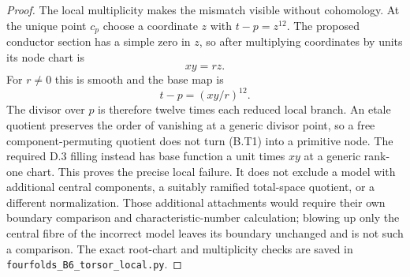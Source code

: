 \begin{proof}
The local multiplicity makes the mismatch visible without
cohomology.  At the unique point $c_p$ choose a coordinate $z$
with $t-p=z^{12}$.  The proposed conductor section has a simple
zero in $z$, so after multiplying coordinates by units its node
chart is
\[
 xy=rz.
\]
For $r\ne0$ this is smooth and the base map is
\[
 t-p=(xy/r)^{12}.
 \tag{B.T1}
\]
The divisor over $p$ is therefore twelve times each reduced local
branch.  An etale quotient preserves the order of vanishing at
a generic divisor point, so a free component-permuting quotient
does not turn (B.T1) into a primitive node.
The required D.3 filling instead has base function a unit times
$xy$ at a generic rank-one chart.  This proves the precise local
failure.  It does not exclude a model with additional central
components, a suitably ramified total-space quotient, or a
different normalization.  Those additional attachments would
require their own boundary comparison and characteristic-number
calculation; blowing up only the central fibre of the incorrect
model leaves its boundary unchanged and is not such a comparison.
The exact root-chart and multiplicity checks are
saved in \texttt{fourfolds\_B6\_torsor\_local.py}.
\end{proof}
